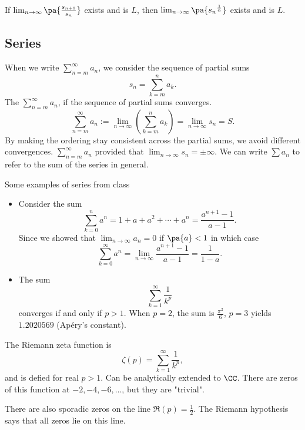 \documentclass[11pt]{scrartcl}
\numberwithin{equation}{section}
\begin{document}
\begin{corollary}
    If $\lim_{n\rightarrow\infty} \pa{\frac{s_{n+1}}{s_n}}$ exists and is $L$, then 
    $\lim_{n\rightarrow\infty} \pa{{s_n}^{\frac{1}{n}}}$ exists and is $L$.
\end{corollary}

\subsection{Series}

When we write $\sum_{n=m}^{\infty}a_n$,
we consider the sequence of partial sums 
\[ s_n = \sum_{k=m}^{n}a_k.\]
The  $\sum_{n=m}^{\infty}a_n$, 
if the sequence of partial sums converges.
\[ 
    \sum_{n=m}^{\infty}a_n := \lim_{n\rightarrow \infty}{\left(\sum_{k=m}^{n}a_k\right)} = \lim_{n\rightarrow \infty}{s_n}= S.
\]
By making the ordering stay consistent across the 
partial sums, we avoid different convergences.
$\sum_{n=m}^{\infty}a_n$  provided 
that $\lim_{n\rightarrow \infty}{s_n} = \pm\infty$.
We can write $\sum a_n$ to refer to the sum of the series in general.

\begin{example}
    Some examples of series from class
    \begin{itemize}
        \item Consider the sum
        \[ \sum_{k=0}^{n}a^n = 1+a+a^2+\cdots+a^n= \frac{a^{n+1}-1}{a-1}.\]
        Since we showed that $\lim_{n\rightarrow \infty}{a_n} = 0$ 
        if $\pa{a}<1$ in which case 
        \[ \sum_{k=0}^{\infty}a^n = \lim_{n\rightarrow \infty}\frac{a^{n+1}-1}{a-1} = \frac{1}{1-a}.\]
        \item The sum
        \[ \sum_{k=1}^{\infty}\frac{1}{k^p}\]
        converges if and only if $p>1$.
        When $p=2$, the sum is $\frac{\pi^2}{6}$, $p=3$ yields 
        $1.2020569$ (Ap\'ery's constant).
    \end{itemize}
\end{example}

\begin{remark}
    The Riemann zeta function is 
    \[ \zeta(p) = \sum_{k=1}^{\infty}\frac{1}{k^p},\]
    and is defied for real $p>1$. Can be analytically 
    extended to $\CC$.
    There are zeros of this function at $-2,-4,-6,\dots$, but they 
    are "trivial".

    There are also sporadic zeros on the line $\Re(p) = \frac{1}{2}$.
    The Riemann hypothesis says that all zeros lie on this line.
\end{remark}
\end{document}
